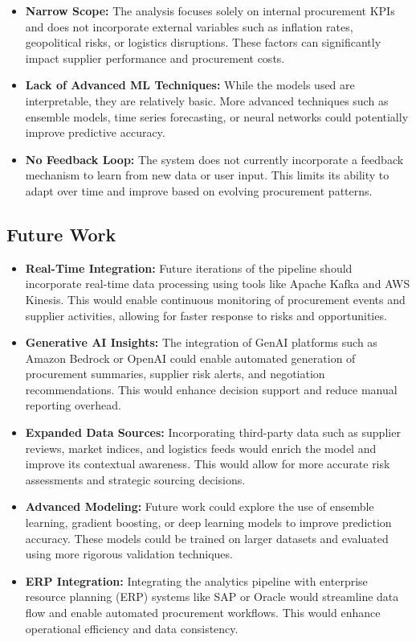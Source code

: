 \documentclass[10pt, twocolumn]{article}
\begin{document}
\begin{itemize}
    \item \textbf{Narrow Scope:} The analysis focuses solely on internal procurement KPIs and does not incorporate external variables such as inflation rates, geopolitical risks, or logistics disruptions. These factors can significantly impact supplier performance and procurement costs.

    \item \textbf{Lack of Advanced ML Techniques:} While the models used are interpretable, they are relatively basic. More advanced techniques such as ensemble models, time series forecasting, or neural networks could potentially improve predictive accuracy.

    \item \textbf{No Feedback Loop:} The system does not currently incorporate a feedback mechanism to learn from new data or user input. This limits its ability to adapt over time and improve based on evolving procurement patterns.
\end{itemize}

\subsection*{Future Work}
\begin{itemize}
    \item \textbf{Real-Time Integration:} Future iterations of the pipeline should incorporate real-time data processing using tools like Apache Kafka and AWS Kinesis. This would enable continuous monitoring of procurement events and supplier activities, allowing for faster response to risks and opportunities.

    \item \textbf{Generative AI Insights:} The integration of GenAI platforms such as Amazon Bedrock or OpenAI could enable automated generation of procurement summaries, supplier risk alerts, and negotiation recommendations. This would enhance decision support and reduce manual reporting overhead.

    \item \textbf{Expanded Data Sources:} Incorporating third-party data such as supplier reviews, market indices, and logistics feeds would enrich the model and improve its contextual awareness. This would allow for more accurate risk assessments and strategic sourcing decisions.

    \item \textbf{Advanced Modeling:} Future work could explore the use of ensemble learning, gradient boosting, or deep learning models to improve prediction accuracy. These models could be trained on larger datasets and evaluated using more rigorous validation techniques.

    \item \textbf{ERP Integration:} Integrating the analytics pipeline with enterprise resource planning (ERP) systems like SAP or Oracle would streamline data flow and enable automated procurement workflows. This would enhance operational efficiency and data consistency.
\end{itemize}
\end{document}
